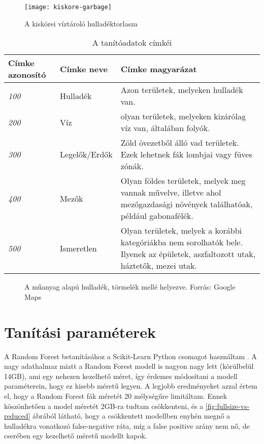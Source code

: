 \begin{figure}[H]
	\centering
	\texttt{[image: kiskore-garbage]}
	\caption{A kiskörei víztároló hulladéktorlasza \cite{petkupa2024}}
    \label{fig:kiskore-waste}
\end{figure}

\begin{table}[H]
	\centering
	\begin{tabular}{ | p{} | p{} | p{} | }
		\hline
		\textbf{Címke azonosító} & \textbf{Címke neve} & \textbf{Címke magyarázat} \\
		\hline \hline
		\emph{100} & Hulladék & Azon területek, melyeken hulladék van. \\
		\hline
		\emph{200} & Víz & olyan területek, melyeken kizárólag víz van, általában folyók. \\
		\hline
		\emph{300} & Legelők/Erdők & Zöld övezetből álló vad területek. Ezek lehetnek fák lombjai vagy füves zónák. \\
		\hline
        \emph{400} & Mezők & Olyan földes területek, melyek meg vannak művelve, illetve ahol mezőgazdasági növények találhatóak, például gabonafélék. \\
		\hline
        \emph{500} & Ismeretlen & Olyan területek, melyek a korábbi kategóriákba nem sorolhatók bele. Ilyenek az épületek, aszfaltozott utak, háztetők, mezei utak. \\
		\hline
	\end{tabular}
	\caption{A tanítóadatok címkéi}
	\label{tab:waste-detection-labels}
\end{table}

\begin{figure}[H]
	\centering
	\hspace{5pt}
	\caption{A műanyag alapú hulladék, törmelék mellé helyezve. Forrás: Google Maps}
	\label{fig:waste-vs-debris}
\end{figure}



\section{Tanítási paraméterek}
\label{ch:teaching-params}

A Random Forest betanításához a Scikit-Learn Python csomagot használtam \cite{scikit-learn}. A nagy adathalmaz miatt a Random Forest modell is nagyon nagy lett (körülbelül 14GB), ami egy nehezen kezelhető méret, így érdemes módosítani a modell paraméterein, hogy ez kisebb méretű legyen. A legjobb eredményeket azzal értem el, hogy a Random Forest fák méretét 20 mélységűre limitáltam. Ennek köszönhetően a model méretét 2GB-ra tudtam csökkenteni, és a \ref{fig:fullsize-vs-reduced} ábrából látható, hogy a csökkentett modellben enyhén megnő a hulladékra vonatkozó false-negative ráta, míg a false positive arány nem nő, de cserében egy kezelhető méretű modellt kapok.

